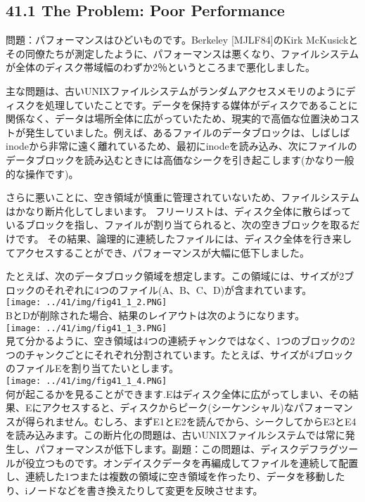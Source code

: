 \hypertarget{the-problem-poor-performance}{%
\subsection*{41.1 The Problem: Poor
Performance}\label{the-problem-poor-performance}}

問題：パフォーマンスはひどいものです。Berkeley {[}MJLF84{]}のKirk
McKusickとその同僚たちが測定したように、パフォーマンスは悪くなり、ファイルシステムが全体のディスク帯域幅のわずか2％というところまで悪化しました。

主な問題は、古いUNIXファイルシステムがランダムアクセスメモリのようにディスクを処理していたことです。データを保持する媒体がディスクであることに関係なく、データは場所全体に広がっていたため、現実的で高価な位置決めコストが発生していました。例えば、あるファイルのデータブロックは、しばしばinodeから非常に遠く離れているため、最初にinodeを読み込み、次にファイルのデータブロックを読み込むときには高価なシークを引き起こします(かなり一般的な操作です)。

さらに悪いことに、空き領域が慎重に管理されていないため、ファイルシステムはかなり断片化してしまいます。
フリーリストは、ディスク全体に散らばっているブロックを指し、ファイルが割り当てられると、次の空きブロックを取るだけです。
その結果、論理的に連続したファイルには、ディスク全体を行き来してアクセスすることができ、パフォーマンスが大幅に低下しました。

たとえば、次のデータブロック領域を想定します。この領域には、サイズが2ブロックのそれぞれに4つのファイル(A、B、C、D)が含まれています。\\
\texttt{[image: ../41/img/fig41\_1\_2.PNG]}\\
BとDが削除された場合、結果のレイアウトは次のようになります。\\
\texttt{[image: ../41/img/fig41\_1\_3.PNG]}\\
見て分かるように、空き領域は4つの連続チャンクではなく、1つのブロックの2つのチャンクごとにそれぞれ分割されています。たとえば、サイズが4ブロックのファイルEを割り当てたいとします。\\
\texttt{[image: ../41/img/fig41\_1\_4.PNG]}\\
何が起こるかを見ることができます.Eはディスク全体に広がってしまい、その結果、Eにアクセスすると、ディスクからピーク(シーケンシャル)なパフォーマンスが得られません。むしろ、まずE1とE2を読んでから、シークしてからE3とE4を読み込みます。この断片化の問題は、古いUNIXファイルシステムでは常に発生し、パフォーマンスが低下します。副題：この問題は、ディスクデフラグツールが役立つものです。オンデイスクデータを再編成してファイルを連続して配置し、連続した1つまたは複数の領域に空き領域を作ったり、データを移動したり、iノードなどを書き換えたりして変更を反映させます。

